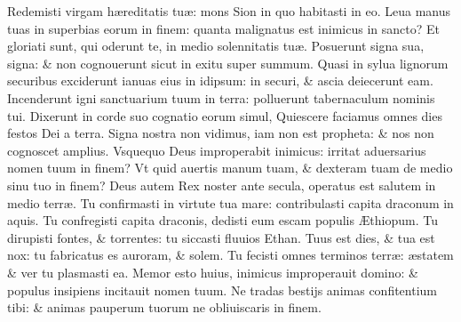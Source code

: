 \documentclass[a5paper,10pt]{book}
\def\ae{æ}
\def\AE{Æ}
\begin{document}
\begin{multicols*}{2}
\newline \color{red} R\color{black}edemisti virgam h\ae reditatis tu\ae : mons Sion in quo habitasti in eo.
\newline \color{red} L\color{black}eua manus tuas in superbias eorum in finem: quanta malignatus est inimicus in sancto?
\newline \color{red} E\color{black}t gloriati sunt, qui oderunt te, in medio solennitatis tu\ae .
\newline \color{red} P\color{black}osuerunt signa sua, signa: \& non cognouerunt sicut in exitu super summum.
\newline \color{red} Q\color{black}uasi in sylua lignorum securibus exciderunt ianuas eius in idipsum: in securi, \& ascia deiecerunt eam.
\newline \color{red} I\color{black}ncenderunt igni sanctuarium tuum in terra: polluerunt tabernaculum nominis tui.
\newline \color{red} D\color{black}ixerunt in corde suo cognatio eorum simul, Quiescere faciamus omnes dies festos Dei a terra.
\newline \color{red} S\color{black}igna nostra non vidimus, iam non est propheta: \& nos non cognoscet amplius.
\newline \color{red} V\color{black}squequo Deus improperabit inimicus: irritat aduersarius nomen tuum in finem?
\newline \color{red} V\color{black}t quid auertis manum tuam, \& dexteram tuam de medio sinu tuo in finem?
\newline \color{red} D\color{black}eus autem Rex noster ante secula, operatus est salutem in medio terr\ae .
\newline \color{red} T\color{black}u confirmasti in virtute tua mare: contribulasti capita draconum in aquis.
\newline \color{red} T\color{black}u confregisti capita draconis, dedisti eum escam populis \AE thiopum.
\newline \color{red} T\color{black}u dirupisti fontes, \& torrentes: tu siccasti fluuios Ethan.
\newline \color{red} T\color{black}uus est dies, \& tua est nox: tu fabricatus es auroram, \& solem.
\newline \color{red} T\color{black}u fecisti omnes terminos terr\ae : \ae statem \& ver tu plasmasti ea.
\newline \color{red} M\color{black}emor esto huius, inimicus improperauit domino: \& populus insipiens incitauit nomen tuum.
\newline \color{red} N\color{black}e tradas bestijs animas confitentium tibi: \& animas pauperum tuorum ne obliuiscaris in finem.%

\end{multicols*}
\end{document}
